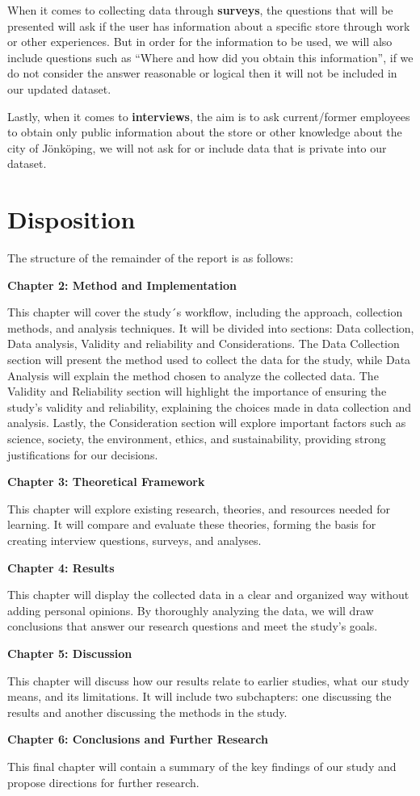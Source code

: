 When it comes to collecting data through \textbf{surveys}, the questions that will be presented will ask if the user has information about a specific store through work or other experiences. But in order for the information to be used, we will also include questions such as “Where and how did you obtain this information”, if we do not consider the answer reasonable or logical then it will not be included in our updated dataset. 


Lastly, when it comes to \textbf{interviews}, the aim is to ask current/former employees to obtain only public information about the store or other knowledge about the city of Jönköping, we will not ask for or include data that is private into our dataset. 

\section{Disposition}
The structure of the remainder of the report is as follows: 

\textbf{Chapter 2: Method and Implementation}

This chapter will cover the study´s workflow, including the approach, collection methods, and analysis techniques. It will be divided into sections: Data collection, Data analysis, Validity and reliability and Considerations. The Data Collection section will present the method used to collect the data for the study, while Data Analysis will explain the method chosen to analyze the collected data. The Validity and Reliability section will highlight the importance of ensuring the study’s validity and reliability, explaining the choices made in data collection and analysis. Lastly, the Consideration section will explore important factors such as science, society, the environment, ethics, and sustainability, providing strong justifications for our decisions.




\textbf{Chapter 3: Theoretical Framework} 

This chapter will explore existing research, theories, and resources needed for learning. It will compare and evaluate these theories, forming the basis for creating interview questions, surveys, and analyses.  

\textbf{Chapter 4: Results}

This chapter will display the collected data in a clear and organized way without adding personal opinions. By thoroughly analyzing the data, we will draw conclusions that answer our research questions and meet the study's goals.


\textbf{Chapter 5: Discussion}


This chapter will discuss how our results relate to earlier studies, what our study means, and its limitations. It will include two subchapters: one discussing the results and another discussing the methods in the study.  

 
\textbf{Chapter 6: Conclusions and Further Research}

This final chapter will contain a summary of the key findings of our study and propose directions for further research.  